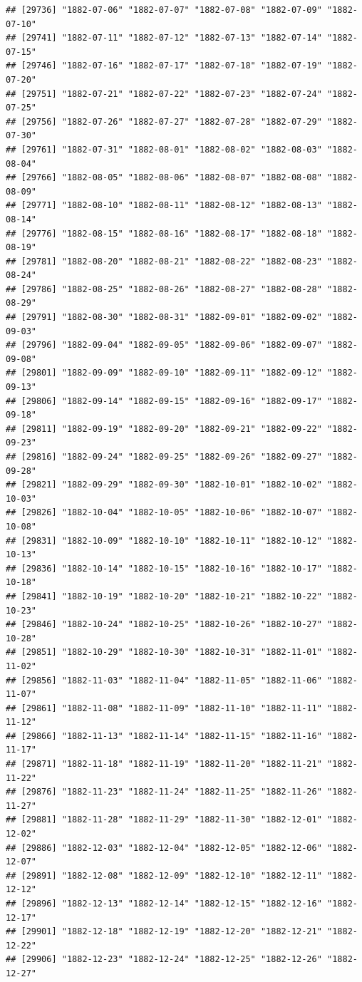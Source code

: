 \documentclass{article}\usepackage[]{graphicx}\usepackage[]{color}
\makeatletter
\newenvironment{kframe}{%
 \def\at@end@of@kframe{}%
 \ifinner\ifhmode%
  \def\at@end@of@kframe{\end{minipage}}%
  \begin{minipage}{\columnwidth}%
 \fi\fi%
 \def\FrameCommand##1{\hskip\@totalleftmargin \hskip-\fboxsep
 \colorbox{shadecolor}{##1}\hskip-\fboxsep
     \hskip-\linewidth \hskip-\@totalleftmargin \hskip\columnwidth}%
 \MakeFramed {\advance\hsize-\width
   \@totalleftmargin\z@ \linewidth\hsize
   \@setminipage}}%
 {\par\unskip\endMakeFramed%
 \at@end@of@kframe}
\newenvironment{knitrout}{}{} %
\makeatother
\begin{document}
\begin{description}
\begin{knitrout}
\begin{kframe}
\begin{verbatim}
## [29736] "1882-07-06" "1882-07-07" "1882-07-08" "1882-07-09" "1882-07-10"
## [29741] "1882-07-11" "1882-07-12" "1882-07-13" "1882-07-14" "1882-07-15"
## [29746] "1882-07-16" "1882-07-17" "1882-07-18" "1882-07-19" "1882-07-20"
## [29751] "1882-07-21" "1882-07-22" "1882-07-23" "1882-07-24" "1882-07-25"
## [29756] "1882-07-26" "1882-07-27" "1882-07-28" "1882-07-29" "1882-07-30"
## [29761] "1882-07-31" "1882-08-01" "1882-08-02" "1882-08-03" "1882-08-04"
## [29766] "1882-08-05" "1882-08-06" "1882-08-07" "1882-08-08" "1882-08-09"
## [29771] "1882-08-10" "1882-08-11" "1882-08-12" "1882-08-13" "1882-08-14"
## [29776] "1882-08-15" "1882-08-16" "1882-08-17" "1882-08-18" "1882-08-19"
## [29781] "1882-08-20" "1882-08-21" "1882-08-22" "1882-08-23" "1882-08-24"
## [29786] "1882-08-25" "1882-08-26" "1882-08-27" "1882-08-28" "1882-08-29"
## [29791] "1882-08-30" "1882-08-31" "1882-09-01" "1882-09-02" "1882-09-03"
## [29796] "1882-09-04" "1882-09-05" "1882-09-06" "1882-09-07" "1882-09-08"
## [29801] "1882-09-09" "1882-09-10" "1882-09-11" "1882-09-12" "1882-09-13"
## [29806] "1882-09-14" "1882-09-15" "1882-09-16" "1882-09-17" "1882-09-18"
## [29811] "1882-09-19" "1882-09-20" "1882-09-21" "1882-09-22" "1882-09-23"
## [29816] "1882-09-24" "1882-09-25" "1882-09-26" "1882-09-27" "1882-09-28"
## [29821] "1882-09-29" "1882-09-30" "1882-10-01" "1882-10-02" "1882-10-03"
## [29826] "1882-10-04" "1882-10-05" "1882-10-06" "1882-10-07" "1882-10-08"
## [29831] "1882-10-09" "1882-10-10" "1882-10-11" "1882-10-12" "1882-10-13"
## [29836] "1882-10-14" "1882-10-15" "1882-10-16" "1882-10-17" "1882-10-18"
## [29841] "1882-10-19" "1882-10-20" "1882-10-21" "1882-10-22" "1882-10-23"
## [29846] "1882-10-24" "1882-10-25" "1882-10-26" "1882-10-27" "1882-10-28"
## [29851] "1882-10-29" "1882-10-30" "1882-10-31" "1882-11-01" "1882-11-02"
## [29856] "1882-11-03" "1882-11-04" "1882-11-05" "1882-11-06" "1882-11-07"
## [29861] "1882-11-08" "1882-11-09" "1882-11-10" "1882-11-11" "1882-11-12"
## [29866] "1882-11-13" "1882-11-14" "1882-11-15" "1882-11-16" "1882-11-17"
## [29871] "1882-11-18" "1882-11-19" "1882-11-20" "1882-11-21" "1882-11-22"
## [29876] "1882-11-23" "1882-11-24" "1882-11-25" "1882-11-26" "1882-11-27"
## [29881] "1882-11-28" "1882-11-29" "1882-11-30" "1882-12-01" "1882-12-02"
## [29886] "1882-12-03" "1882-12-04" "1882-12-05" "1882-12-06" "1882-12-07"
## [29891] "1882-12-08" "1882-12-09" "1882-12-10" "1882-12-11" "1882-12-12"
## [29896] "1882-12-13" "1882-12-14" "1882-12-15" "1882-12-16" "1882-12-17"
## [29901] "1882-12-18" "1882-12-19" "1882-12-20" "1882-12-21" "1882-12-22"
## [29906] "1882-12-23" "1882-12-24" "1882-12-25" "1882-12-26" "1882-12-27"

\end{verbatim}
\end{kframe}
\end{knitrout}
\end{description}
\end{document}
